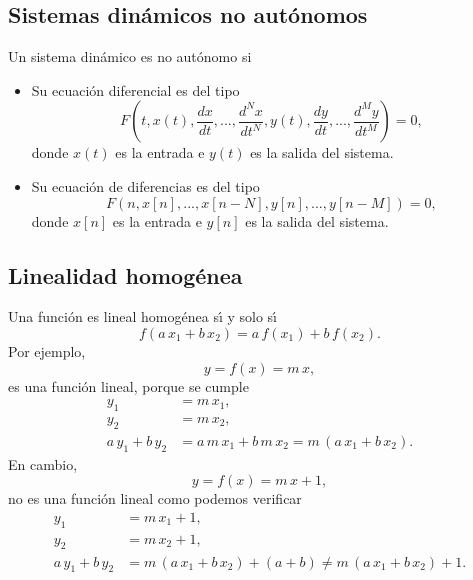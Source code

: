 \subsection{Sistemas din\'{a}micos no aut\'{o}nomos}

Un sistema din\'{a}mico es no aut\'{o}nomo si
\begin{itemize}
\item Su ecuaci\'{o}n diferencial es del tipo
  \begin{equation}
    F(t, x(t), \frac{dx}{dt},..., \frac{d^{N}x}{dt^{N}}, y(t), \frac{dy}{dt},..., \frac{d^{M}y}{dt^{M}}) = 0,
  \end{equation}
  donde $x(t)$ es la entrada e $y(t)$ es la salida del sistema.

\item Su ecuaci\'{o}n de diferencias es del tipo
  \begin{equation}
    F(n, x[n], ..., x[n-N], y[n], ..., y[n-M]) = 0, 
  \end{equation}
  donde $x[n]$ es la entrada e $y[n]$ es la salida del sistema.
\end{itemize}

\subsection{Linealidad homogénea}

Una funci\'{o}n es lineal homogénea s\'{\i} y solo s\'{\i}
\begin{equation}
  f\left(a \, x_{1} + b \, x_{2}\right) = a \, f\left(x_{1}\right) + b \, f\left(x_{2}\right) .
\end{equation}
Por ejemplo,
\begin{equation}
  y = f(x) = m \, x,
\end{equation}
es una funci\'{o}n lineal, porque se cumple
\begin{equation}
  \begin{array}{ll}
    y_{1} & = m \, x_{1}, \\ 
    y_{2} & = m \, x_{2}, \\ 
    a \, y_{1}+ b \, y_{2} & = a \, m \, x_{1} + b \, m \, x_{2} = 
       m \, \left( a \, x_{1}+ b \, x_{2}\right) .
  \end{array}
\end{equation}
En cambio,
\begin{equation}
  y = f(x) = m \, x + 1,
\end{equation}
no es una funci\'{o}n lineal como podemos verificar
\begin{equation}
  \begin{array}{ll}
    y_{1} & = m \, x_{1}+1, \\ 
    y_{2} & = m \, x_{2}+1, \\ 
    a \, y_{1}+ b \, y_{2} & =
      m \, \left( a\, x_{1}+ b \, x_{2}\right) +\left( a+b\right) \neq
    m \, \left( a \, x_{1}+b \, x_{2}\right) +1.
  \end{array}
\end{equation}

